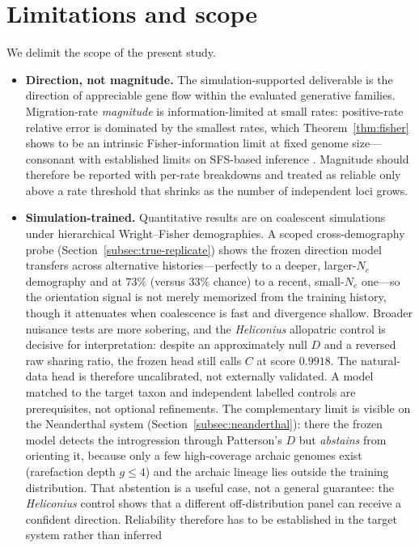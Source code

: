 \documentclass[11pt]{article}
\theoremstyle{plain}
\theoremstyle{definition}
\theoremstyle{remark}
\begin{document}
\section{Limitations and scope}
\label{sec:limitations}
We delimit the scope of the present study.
\begin{itemize}
\item \textbf{Direction, not magnitude.} The simulation-supported deliverable is the direction of
appreciable gene flow within the evaluated generative families. Migration-rate \emph{magnitude} is information-limited at small rates: positive-rate
relative error is dominated by the smallest rates, which Theorem~\ref{thm:fisher} shows to be an
intrinsic Fisher-information limit at fixed genome size---consonant with established limits on
SFS-based inference \citep{terhorst2015fundamental}. Magnitude should therefore be reported with
per-rate breakdowns and treated as reliable only above a rate threshold that shrinks as the number
of independent loci grows.
\item \textbf{Simulation-trained.} Quantitative results are on coalescent simulations under
hierarchical Wright--Fisher demographies. A scoped cross-demography probe
(Section~\ref{subsec:true-replicate}) shows the frozen direction model transfers across alternative
histories---perfectly to a deeper, larger-$N_e$ demography and at $73\%$ (versus $33\%$ chance) to a
recent, small-$N_e$ one---so the orientation signal is not merely memorized from the training history,
though it attenuates when coalescence is fast and divergence shallow. Broader nuisance tests are more
sobering, and the \textit{Heliconius} allopatric control is decisive for interpretation: despite an
approximately null $D$ and a reversed raw sharing ratio, the frozen head still calls $C$ at score
$0.9918$. The natural-data head is therefore uncalibrated, not externally validated. A model matched
to the target taxon and independent labelled controls are prerequisites, not optional refinements.
The complementary limit is visible on the Neanderthal system (Section~\ref{subsec:neanderthal}): there the frozen model
detects the introgression through Patterson's $D$ but \emph{abstains} from orienting it, because only
a few high-coverage archaic genomes exist (rarefaction depth $g\le4$) and the archaic lineage lies
outside the training distribution. That abstention is a useful case, not a general guarantee: the
\textit{Heliconius} control shows that a different off-distribution panel can receive a confident
direction. Reliability therefore has to be established in the target system rather than inferred

\end{itemize}
\end{document}

